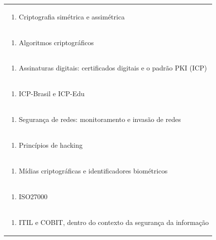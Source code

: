 \documentclass[11pt]{article}
\begin{document}
\begin{center}
\begin{longtable}{|p{4cm}|p{4cm}|p{4cm}|p{4cm}|}
\multicolumn{4}{|p{\dimexpr 16cm + 6\tabcolsep\relax}|}{\begin{enumerate}[start=2]\item Criptografia simétrica e assimétrica\end{enumerate}}\\
\multicolumn{4}{|p{\dimexpr 16cm + 6\tabcolsep\relax}|}{\begin{enumerate}[start=3]\item Algoritmos criptográficos\end{enumerate}}\\
\multicolumn{4}{|p{\dimexpr 16cm + 6\tabcolsep\relax}|}{\begin{enumerate}[start=4]\item Assinaturas digitais: certificados digitais e o padrão PKI (ICP)\end{enumerate}}\\
\multicolumn{4}{|p{\dimexpr 16cm + 6\tabcolsep\relax}|}{\begin{enumerate}[start=5]\item ICP-Brasil e ICP-Edu\end{enumerate}}\\
\multicolumn{4}{|p{\dimexpr 16cm + 6\tabcolsep\relax}|}{\begin{enumerate}[start=6]\item Segurança de redes: monitoramento e invasão de redes\end{enumerate}}\\
\multicolumn{4}{|p{\dimexpr 16cm + 6\tabcolsep\relax}|}{\begin{enumerate}[start=7]\item Princípios de hacking\end{enumerate}}\\
\multicolumn{4}{|p{\dimexpr 16cm + 6\tabcolsep\relax}|}{\begin{enumerate}[start=8]\item Mídias criptográficas e identificadores biométricos\end{enumerate}}\\
\multicolumn{4}{|p{\dimexpr 16cm + 6\tabcolsep\relax}|}{\begin{enumerate}[start=9]\item ISO27000\end{enumerate}}\\
\multicolumn{4}{|p{\dimexpr 16cm + 6\tabcolsep\relax}|}{\begin{enumerate}[start=10]\item ITIL e COBIT, dentro do contexto da segurança da informação\end{enumerate}}\\

\end{longtable}
\end{center}
\end{document}
